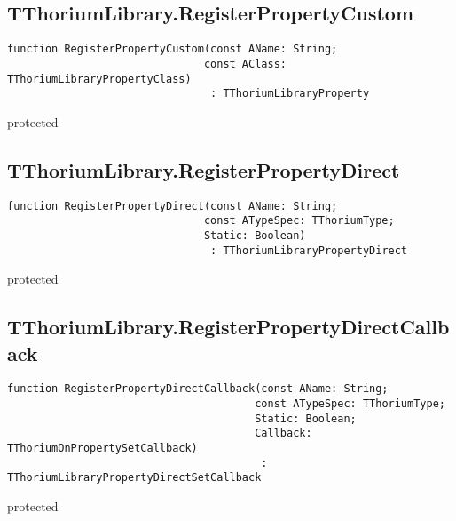 \subsection{TThoriumLibrary.RegisterPropertyCustom}
\label{thoriumcore:thorium:tthoriumlibrary:registerpropertycustom}
\begin{FPCList}
\Synopsis
\Declaration 

\begin{verbatim}
function RegisterPropertyCustom(const AName: String;
                               const AClass: TThoriumLibraryPropertyClass)
                                : TThoriumLibraryProperty
\end{verbatim}
\Visibility
protected
\Description
\Errors
\end{FPCList}
\subsection{TThoriumLibrary.RegisterPropertyDirect}
\label{thoriumcore:thorium:tthoriumlibrary:registerpropertydirect}
\begin{FPCList}
\Synopsis
\Declaration 

\begin{verbatim}
function RegisterPropertyDirect(const AName: String;
                               const ATypeSpec: TThoriumType;
                               Static: Boolean)
                                : TThoriumLibraryPropertyDirect
\end{verbatim}
\Visibility
protected
\Description
\Errors
\end{FPCList}
\subsection{TThoriumLibrary.RegisterPropertyDirectCallback}
\label{thoriumcore:thorium:tthoriumlibrary:registerpropertydirectcallback}
\begin{FPCList}
\Synopsis
\Declaration 

\begin{verbatim}
function RegisterPropertyDirectCallback(const AName: String;
                                       const ATypeSpec: TThoriumType;
                                       Static: Boolean;
                                       Callback: TThoriumOnPropertySetCallback)
                                        : TThoriumLibraryPropertyDirectSetCallback
\end{verbatim}
\Visibility
protected
\Description
\Errors
\end{FPCList}

